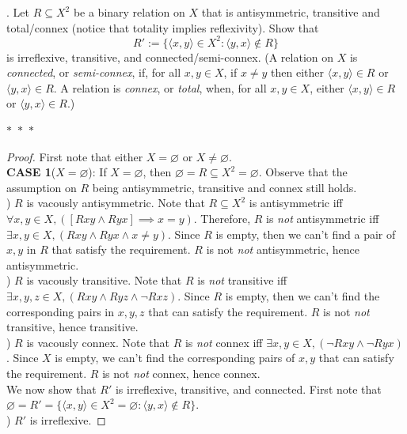 \documentclass[12pt]{article}
\begin{document}
\newpage
{}. Let $R \subseteq X^2$ be a binary relation on $X$ that is antisymmetric, 
transitive and total/connex (notice that totality implies reflexivity). Show that 
$$R' := \{\langle x,y \rangle \in X^2: \langle y, x \rangle \notin R\}$$
\noindent
is irreflexive, transitive, and connected/semi-connex. (A relation on $X$  is \emph{connected}, 
or \emph{semi-connex}, if, for all $x,y \in X$, if $x\neq y$ then 
either $\langle x, y \rangle \in R$ or $\langle y, x \rangle \in R$. A relation 
is \emph{connex}, or \emph{total}, when, for all $x,y \in X$, either $\langle x, 
y \rangle \in R$ or $\langle y, x \rangle \in R$.)
\begin{center}
    $\ast$~$\ast$~$\ast$
\end{center}
\begin{proof}
    First note that either $X = \varnothing$ or $X \neq \varnothing$.\\

    \noindent\textbf{CASE 1}($X = \varnothing$): If $X = \varnothing$, then $\varnothing = R \subseteq X^2 = \varnothing$. 
    Observe that the assumption on $R$ being antisymmetric, transitive and connex still holds.\\
    
    ) $R$ is vacously antisymmetric. Note that $R \subseteq X^2$ is antisymmetric iff
    $\forall x, y \in X, ([Rxy \wedge Ryx] \implies x = y)$. Therefore, $R$ is \emph{not} antisymmetric 
    iff $\exists x, y \in X, (Rxy \wedge Ryx \wedge x \neq y)$. Since $R$ is empty, then
    we can't find a pair of $x, y$ in $R$ that satisfy the requirement. $R$ is not \emph{not} 
    antisymmetric, hence antisymmetric.\\

    ) $R$ is vacously transitive. Note that $R$ is \emph{not} transitive iff 
    $\exists x,y,z \in X, (Rxy \wedge Ryz \wedge \neg Rxz)$. Since $R$ is empty, then we can't find
    the corresponding pairs in $x,y,z$ that can satisfy the requirement. 
    $R$ is not \emph{not} transitive, hence transitive.\\
    
    ) $R$ is vacously connex. Note that $R$ is \emph{not} connex iff
    $\exists x, y \in X, (\neg Rxy \wedge \neg Ryx)$. Since $X$ is empty, we can't find the
    corresponding pairs of $x, y$ that can satisfy the requirement. $R$ is not \emph{not} 
    connex, hence connex.\\

    \noindent We now show that $R'$ is irreflexive, transitive, and connected.
    First note that $\varnothing = R' = \{\langle x,y \rangle \in X^2 = \varnothing: \langle y, x \rangle \notin R\}$.\\

    ) $R'$ is irreflexive. 

\end{proof}
\end{document}
